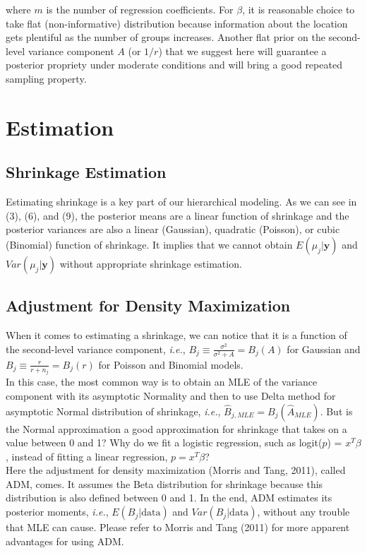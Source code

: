 \documentclass[article]{jss}
\begin{document}
where $m$ is the number of regression coefficients. For $\beta$, it is reasonable choice to take flat (non-informative) distribution because information about the location gets plentiful as the number of groups increases. Another flat prior on the second-level variance component  $A$ (or $1/r$) that we suggest here will guarantee a posterior propriety under moderate conditions and will bring a good repeated sampling property.
\\

\section[Estimation]{Estimation}

\subsection[Shrinkage Estimation]{Shrinkage Estimation}
Estimating shrinkage is a key part of our hierarchical modeling. As we can see in (3), (6), and (9), the posterior means are a linear function of shrinkage and the posterior variances are also a linear (Gaussian), quadratic (Poisson), or cubic (Binomial) function of shrinkage. It implies that we cannot obtain $E(\mu_{j}\vert \textbf{y})$ and $Var(\mu_{j}\vert \textbf{y})$ without appropriate shrinkage estimation.

\subsection[ADM]{Adjustment for Density Maximization}
When it comes to estimating a shrinkage, we can notice that it is a function of the second-level variance component, \emph{i.e.}, $B_{j}\equiv\frac{\sigma^{2}}{\sigma^{2}+A}=B_{j}(A)$ for Gaussian and $B_{j}\equiv\frac{r}{r+n_{j}}=B_{j}(r)$ for Poisson and Binomial models.
\\

In this case, the most common way is to obtain an MLE of the variance component with its asymptotic Normality and then to use Delta method for asymptotic Normal distribution of shrinkage, \emph{i.e.}, $\hat{B}_{j, MLE}=B_{j}(\hat{A}_{MLE})$. But is the Normal approximation a good approximation for shrinkage that takes on a value between 0 and 1? Why do we fit a logistic regression, such as logit($p$) = $x^{T}\beta$, instead of fitting a linear regression, $p = x^{T}\beta$?
\\

Here the adjustment for density maximization (Morris and Tang, 2011), called ADM, comes. It assumes the Beta distribution for shrinkage because this distribution is also defined between 0 and 1. In the end, ADM  estimates its posterior moments, \emph{i.e.}, $E(B_{j}\vert\textrm{data})$ and $Var(B_{j}\vert\textrm{data})$, without any trouble that MLE can cause. Please refer to Morris and Tang (2011) for more apparent advantages for using ADM.
\\
\end{document}
